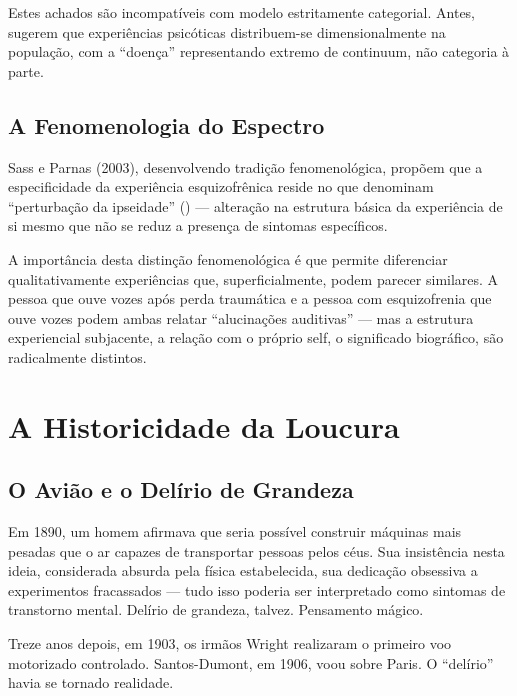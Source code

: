 Estes achados são incompatíveis com modelo estritamente categorial. Antes, sugerem que experiências psicóticas distribuem-se dimensionalmente na população, com a \enquote{doença} representando extremo de continuum, não categoria à parte.

\subsection{A Fenomenologia do Espectro}

Sass e Parnas (2003), desenvolvendo tradição fenomenológica, propõem que a especificidade da experiência esquizofrênica reside no que denominam \enquote{perturbação da ipseidade} () --- alteração na estrutura básica da experiência de si mesmo que não se reduz a presença de sintomas específicos.

A importância desta distinção fenomenológica é que permite diferenciar qualitativamente experiências que, superficialmente, podem parecer similares. A pessoa que ouve vozes após perda traumática e a pessoa com esquizofrenia que ouve vozes podem ambas relatar \enquote{alucinações auditivas} --- mas a estrutura experiencial subjacente, a relação com o próprio self, o significado biográfico, são radicalmente distintos.

\section{A Historicidade da Loucura}
\label{sec:historicidade}

\subsection{O Avião e o Delírio de Grandeza}

Em 1890, um homem afirmava que seria possível construir máquinas mais pesadas que o ar capazes de transportar pessoas pelos céus. Sua insistência nesta ideia, considerada absurda pela física estabelecida, sua dedicação obsessiva a experimentos fracassados --- tudo isso poderia ser interpretado como sintomas de transtorno mental. Delírio de grandeza, talvez. Pensamento mágico.

Treze anos depois, em 1903, os irmãos Wright realizaram o primeiro voo motorizado controlado. Santos-Dumont, em 1906, voou sobre Paris. O \enquote{delírio} havia se tornado realidade.

